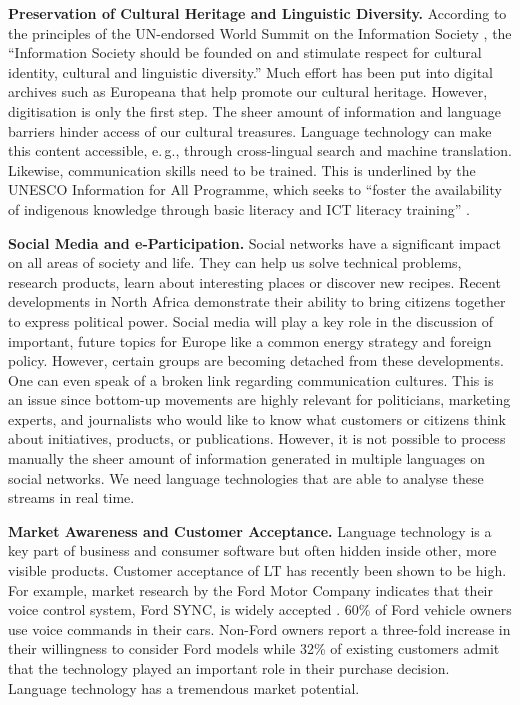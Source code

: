 \documentclass[10pt, plain]{../../metanetpaper}
\begin{document}
\begin{multicols}{2}
\textbf{Preservation of Cultural Heritage and Linguistic Diversity.} According to the principles of the UN-endorsed World Summit on the Information Society \cite{worldsummit2003}, the “Information Society should be founded on and stimulate respect for cultural identity, cultural and linguistic diversity.” Much effort has been put into digital archives such as Europeana that help promote our cultural heritage. However, digitisation is only the first step. The sheer amount of information and language barriers hinder access of our cultural treasures. Language technology can make this content accessible, e.\,g., through cross-lingual search and machine translation. Likewise, communication skills need to be trained. This is underlined by the UNESCO Information for All Programme, which seeks to “foster the availability of indigenous knowledge through basic literacy and ICT literacy training” \cite{Unesco2}.

\textbf{Social Media and e-Participation.} Social networks have a significant impact on all areas of society and life. They can help us solve technical problems, research products, learn about interesting places or discover new recipes. Recent developments in North Africa demonstrate their ability to bring citizens together to express political power. Social media will play a key role in the discussion of important, future topics for Europe like a common energy strategy and foreign policy. However, certain groups are becoming detached from these developments. One can even speak of a broken link regarding communication cultures. This is an issue since bottom-up movements are highly relevant for politicians, marketing experts, and journalists who would like to know what customers or citizens think about initiatives, products, or publications. However, it is not possible to process manually the sheer amount of information generated in multiple languages on social networks. We need language technologies that are able to analyse these streams in real time.

\textbf{Market Awareness and Customer Acceptance.} Language technology is a key part of business and consumer software but often hidden inside other, more visible products. Customer acceptance of LT has recently been shown to be high. For example, market research by the Ford Motor Company indicates that their voice control system, Ford SYNC, is widely accepted \cite{ford}. 60\% of Ford vehicle owners use voice commands in their cars. Non-Ford owners report a three-fold increase in their willingness to consider Ford models while 32\% of existing customers admit that the technology played an important role in their purchase decision. Language technology has a tremendous market potential.


\end{multicols}
\end{document}
